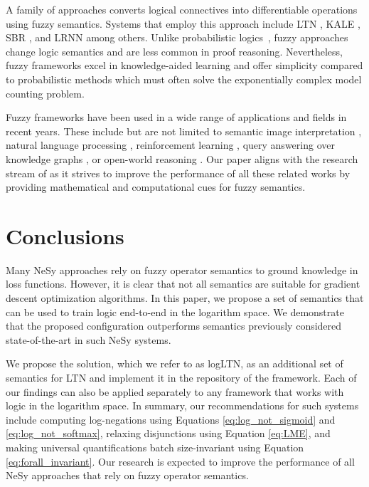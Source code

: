 \documentclass{article}
\theoremstyle{definition}
\begin{document}
A family of approaches converts logical connectives into differentiable operations using fuzzy semantics. 
Systems that employ this approach include 
LTN \cite{serafini_ltn_2016,badreddine_logic_2022}, 
KALE \cite{guo_kale_2016}, 
SBR \cite{diligenti_integrating_2017},
and LRNN \cite{sourek_lifted_2018}
among others.
Unlike probabilistic logics~\cite{manhaeve_deepproblog_2018,winters_deepstochlog_2022}, fuzzy approaches change logic semantics and are less common in proof reasoning.
Nevertheless, fuzzy frameworks excel in knowledge-aided learning and offer simplicity compared to probabilistic methods which must often solve the exponentially complex model counting problem.

Fuzzy frameworks have been used in a wide range of applications and fields in recent years.
These include but are not limited to semantic image interpretation \cite{donadello_ltnimage_2017}, 
natural language processing \cite{bianchi_complementing_2019},
reinforcement learning \cite{injecting_prior_RL_badreddine_2019}, 
query answering over knowledge graphs \cite{arakelyan_cqa_2021,fuzzqe},
or open-world reasoning \cite{wagner_reasoning_2022}.
Our paper aligns with the research stream of \cite{van_krieken_analyzing_2022} as it strives to improve the performance of all these related works by providing mathematical and computational cues for fuzzy semantics.

\section{Conclusions}
Many NeSy approaches rely on fuzzy operator semantics to ground knowledge in loss functions. 
However, it is clear that not all semantics are suitable for gradient descent optimization algorithms. 
In this paper, we propose a set of semantics that can be used to train logic end-to-end in the logarithm space. 
We demonstrate that the proposed configuration outperforms semantics previously considered state-of-the-art in such NeSy systems.

We propose the solution, which we refer to as logLTN, as an additional set of semantics for LTN and implement it in the repository of the framework. 
Each of our findings can also be applied separately to any framework that works with logic in the logarithm space. 
In summary, our recommendations for such systems include computing log-negations using Equations \eqref{eq:log_not_sigmoid} and \eqref{eq:log_not_softmax}, relaxing disjunctions using Equation \eqref{eq:LME}, and making universal quantifications batch size-invariant using Equation \eqref{eq:forall_invariant}. 
Our research is expected to improve the performance of all NeSy approaches that rely on fuzzy operator semantics.



\newpage

\appendix

\end{document}
